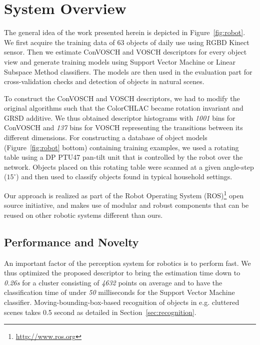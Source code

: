\documentclass[conference]{sty/IEEEtran}
\begin{document}
\section{System Overview}
\label{sec:overview}
The general idea of the work presented herein is depicted in 
Figure~\ref{fig:robot}. We first acquire the training data of 63 objects
of daily use using RGBD Kinect sensor. Then we estimate ConVOSCH and VOSCH descriptors 
for every object view and generate training models using Support Vector
Machine or Linear Subspace Method classifiers. The models are then used
in the evaluation part for cross-validation checks and detection of 
objects in natural scenes.

To construct the ConVOSCH and VOSCH descriptors, we had to modify the original algorithms
such that the ColorCHLAC became rotation invariant and GRSD 
additive. We thus obtained descriptor histograms with 
\emph{1001} bins for ConVOSCH and \emph{137} bins for VOSCH representing the transitions between its different dimensions.
For constructing a database of object models (Figure~\ref{fig:robot} bottom)
containing training examples, we used a rotating
table using a DP PTU47 pan-tilt unit that is controlled by the robot over the
network. Objects placed on this rotating table were scanned at a given
angle-step ($15^\circ$) and then used to classify objects found in
typical household settings.

Our approach is realized as part of the Robot Operating System
(ROS)\footnote{\url{http://www.ros.org}} open source initiative, and makes
use of modular and robust components that can be reused on other robotic
systems different than ours.

\subsection{Performance and Novelty}
An important factor of the perception system for robotics is to perform fast. We thus optimized
the proposed descriptor to bring the estimation time down to \emph{0.26s} for a cluster consisting of 
\emph{4632} points on average and to have the classification time of under \emph{50} milliseconds
for the Support Vector Machine classifier. Moving-bounding-box-based
recognition of objects in e.g. cluttered scenes takes 0.5 second as detailed
in Section~\ref{sec:recognition}.
\end{document}
